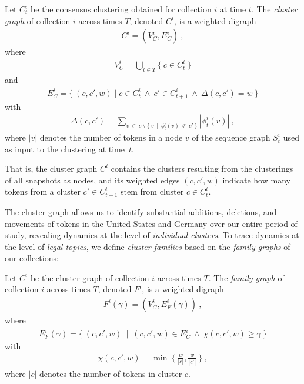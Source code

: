 \begin{definition}\label{def:clustergraph}
	Let $C^i_t$ be the consensus clustering obtained for collection $i$ at time $t$. 
	The \emph{cluster graph} of collection $i$ across times $T$, denoted $C^i$, is a weighted digraph 
	\begin{align*}
	C^i = (V^i_C,E^i_C)~,
	\end{align*}
	where
	\begin{align*}
	V^i_C = \underset{t \in T}{\bigcup} \{~c \in C^i_t~\}
	\end{align*}
	and
	\begin{align*}
	E^i_C = \{~(c,c',w) \mid c\in C^i_t~\wedge~c'\in C^i_{t+1}~\wedge~ \Delta(c,c') = w~\}
	\end{align*}
	with
	\begin{align*}
	\Delta(c,c') = \sum_{v~\in~c~\setminus~\{~v~\mid~\phi^i_t(v)~\notin~c'~\}}|\phi^i_t(v)|~,
	\end{align*}
	where $|v|$ denotes the number of tokens in a node $v$ of the sequence graph $S^i_t$ used as input to the clustering at time~$t$.
\end{definition}

That is, the cluster graph $C^i$ contains the clusters resulting from the clusterings of all snapshots as nodes, 
and its weighted edges $(c,c',w)$ indicate how many tokens from a cluster $c'\in C^i_{t+1}$ stem from cluster $c\in C^i_t$.

The cluster graph allows us to identify substantial additions, deletions, and movements of tokens in the United States and Germany over our entire period of study, revealing dynamics at the level of \emph{individual clusters}.
To trace dynamics at the level of \emph{legal topics}, 
we define \emph{cluster families} based on the \emph{family graphs} of our collections:

\begin{definition}\label{def:familygraph}
	Let $C^i$ be the cluster graph of collection $i$ across times $T$.
	The \emph{family graph} of collection $i$ across times $T$, denoted $F^i$, 
	is a weighted digraph 
	\begin{align*}
	F^i(\gamma) = (V^i_C,E^i_F(\gamma))~,
	\end{align*}
	where
	\begin{align*}
	E^i_F(\gamma) = \{~(c,c',w)~\mid~(c,c',w) \in E^i_C~\wedge~\chi(c,c',w) \geq \gamma~\}
	\end{align*}
	with
	\begin{align*}
	\chi(c,c',w)=\min~\Big\{~\frac{w}{|c|}, \frac{w}{|c'|}~\Big\}~,
	\end{align*}
	where $|c|$ denotes the number of tokens in cluster $c$.
\end{definition}

